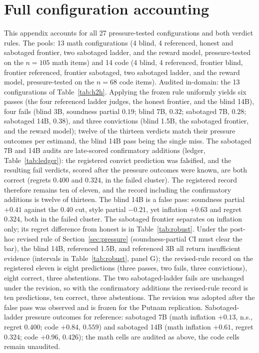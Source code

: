 \section{Full configuration accounting}
\label{app:confusion}
This appendix accounts for all 27 pressure-tested configurations and both verdict rules.
The pools: 13 math configurations (4 blind, 4 referenced, honest and sabotaged frontier, two sabotaged ladder, and the reward model, pressure-tested on the $n{=}105$ math items) and 14 code (4 blind, 4 referenced, frontier blind, frontier referenced, frontier sabotaged, two sabotaged ladder, and the reward model, pressure-tested on the $n{=}68$ code items).
Audited in-domain: the 13 configurations of Table~\ref{tab:h2h}.
Applying the frozen rule uniformly yields six passes (the four referenced ladder judges, the honest frontier, and the blind 14B), four fails (blind 3B, soundness partial $0.19$; blind 7B, $0.32$; sabotaged 7B, $0.28$; sabotaged 14B, $0.38$), and three convictions (blind 1.5B, the sabotaged frontier, and the reward model); twelve of the thirteen verdicts match their pressure outcomes per estimand, the blind 14B pass being the single miss.
The sabotaged 7B and 14B audits are late-scored confirmatory additions (ledger, Table~\ref{tab:ledger}): the registered convict prediction was falsified, and the resulting fail verdicts, scored after the pressure outcomes were known, are both correct (regrets $0.400$ and $0.324$, in the failed cluster).
The registered record therefore remains ten of eleven, and the record including the confirmatory additions is twelve of thirteen.
The blind 14B is a false pass: soundness partial $+0.41$ against the $0.40$ cut, style partial $-0.21$, yet inflation $+0.63$ and regret $0.324$, both in the failed cluster.
The sabotaged frontier separates on inflation only; its regret difference from honest is in Table~\ref{tab:robust}.
Under the post-hoc revised rule of Section~\ref{sec:pressure} (soundness-partial CI must clear the bar), the blind 14B, referenced 1.5B, and referenced 3B all return insufficient evidence (intervals in Table~\ref{tab:robust}, panel G); the revised-rule record on the registered eleven is eight predictions (three passes, two fails, three convictions), eight correct, three abstentions.
The two sabotaged-ladder fails are unchanged under the revision, so with the confirmatory additions the revised-rule record is ten predictions, ten correct, three abstentions.
The revision was adopted after the false pass was observed and is frozen for the Putnam replication.
Sabotaged-ladder pressure outcomes for reference: sabotaged 7B (math inflation $+0.13$, n.s., regret $0.400$; code $+0.84$, $0.559$) and sabotaged 14B (math inflation $+0.61$, regret $0.324$; code $+0.96$, $0.426$); the math cells are audited as above, the code cells remain unaudited.
